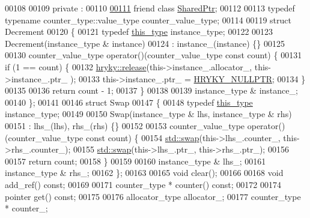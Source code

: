\begin{DoxyCode}
00108 
00109 \textcolor{keyword}{private} :
00110 
\hypertarget{shared__ptr_8h_source_l00111}{}\hyperlink{classhryky_1_1_shared_ptr_a48be174784fa7dc42f93dde5f5639818}{00111}     \textcolor{keyword}{friend} \textcolor{keyword}{class }\hyperlink{classhryky_1_1_shared_ptr}{SharedPtr};
00112 
00113     \textcolor{keyword}{typedef} \textcolor{keyword}{typename} counter\_type::value\_type counter\_value\_type;
00114 
00119     \textcolor{keyword}{struct }Decrement
00120     \{
00121         \textcolor{keyword}{typedef} \hyperlink{classhryky_1_1_shared_ptr}{this_type}   instance\_type;
00122         
00123         Decrement(instance\_type & instance)
00124             : instance\_(instance) \{\}
00125 
00130         counter\_value\_type operator()(counter\_value\_type \textcolor{keyword}{const} count) \{
00131             \textcolor{keywordflow}{if} (1 == count) \{
00132                 \hyperlink{namespacehryky_a9bdf380c3703ef316b807edae92a930a}{hryky::release}(this->instance\_.allocator\_, this->instance\_.ptr\_
      );
00133                 this->instance\_.ptr\_ = \hyperlink{common_8h_a4cd4ac09cfcdbd6b30ee69afc156e210}{HRYKY_NULLPTR};
00134             \}
00135 
00136             \textcolor{keywordflow}{return} count - 1;
00137         \}
00138 
00139         instance\_type & instance\_;
00140     \};
00141 
00146     \textcolor{keyword}{struct }Swap
00147     \{
00148         \textcolor{keyword}{typedef} \hyperlink{classhryky_1_1_shared_ptr_a0fa551b79990485506c88137044ec4b8}{this_type}   instance\_type;
00149 
00150         Swap(instance\_type & lhs, instance\_type & rhs)
00151             : lhs\_(lhs), rhs\_(rhs) \{\}
00152 
00153         counter\_value\_type operator()(counter\_value\_type \textcolor{keyword}{const} count) \{
00154             \hyperlink{classhryky_1_1_shared_ptr_a31ff2b6615bf4240b3ec8bcbcc06acc0}{std::swap}(this->lhs\_.counter\_, this->rhs\_.counter\_);
00155             \hyperlink{classhryky_1_1_shared_ptr_a31ff2b6615bf4240b3ec8bcbcc06acc0}{std::swap}(this->lhs\_.ptr\_, this->rhs\_.ptr\_);
00156 
00157             \textcolor{keywordflow}{return} count;
00158         \}
00159 
00160         instance\_type & lhs\_;
00161         instance\_type & rhs\_;
00162     \};
00163 
00165     \textcolor{keywordtype}{void} clear();
00166 
00168     \textcolor{keywordtype}{void} add\_ref() \textcolor{keyword}{const};
00169 
00171     counter\_type * counter() \textcolor{keyword}{const};
00172 
00174     pointer \textcolor{keyword}{get}() \textcolor{keyword}{const};
00175 
00176     allocator\_type  allocator\_;
00177     counter\_type *  counter\_;

\end{DoxyCode}
